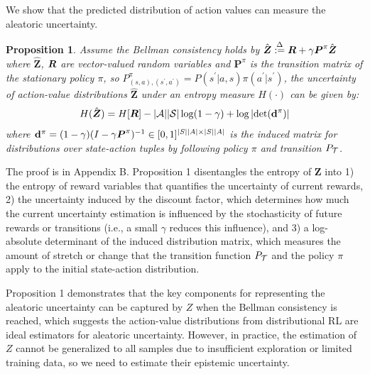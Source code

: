 \documentclass[letterpaper]{article} %
\newcommand{\state}{s}
\newcommand{\action}{a}
\newcommand{\transition}{t}
\newcommand{\reward}{r}
\newtheorem{proposition}{Proposition}
\begin{document}
We show that the predicted distribution of action values can measure the aleatoric uncertainty.

\begin{proposition}
Assume the Bellman consistency holds by $\hat{\boldsymbol{Z}} \overset{\Delta}{:=} \MakeUppercase{\boldsymbol{\reward}} + \gamma \boldsymbol{P}^{\pi}\hat{\boldsymbol{Z}}$ 
where $\hat{\boldsymbol{Z}}$, $\boldsymbol{\MakeUppercase{\reward}}$ are vector-valued random variables and $\boldsymbol{P}^{\pi}$ is the transition matrix of the stationary policy $\pi$, so $P^{\pi}_{(\state,\action),(\state^{\prime},\action^{\prime})}=P(\state^{\prime}|\action,\state)\pi(\action^{\prime}|\state^{\prime})$, the uncertainty of action-value distributions $\hat{\boldsymbol{Z}}$ under an entropy measure $H(\cdot)$ can be given by:
\begin{align}
    H(\hat{\boldsymbol{Z}}) = H[\boldsymbol{\MakeUppercase{\reward}}]-|\mathcal{\MakeUppercase{\action}}||\mathcal{\MakeUppercase{\state}}|\log(1-\gamma)+\log|\text{det}(\mathbf{d}^{\pi})|
\end{align}
where $\mathbf{d}^{\pi}=(1-\gamma)(I-\gamma \boldsymbol{P}^{\pi})^{-1}\in[0,1]^{|\MakeUppercase{\state}||\MakeUppercase{\action}|\times|\MakeUppercase{\state}||\MakeUppercase{\action}|}$ is the induced matrix for distributions over state-action tuples by following policy $\pi$ and transition $P_{\mathcal{\MakeUppercase{t}}}$. 
\end{proposition}

The proof is in Appendix B. Proposition 1 disentangles the entropy of $\boldsymbol{Z}$ into 1) the entropy of reward variables that quantifies the uncertainty of current rewards, 2) the uncertainty induced by the discount factor, which determines how much the current uncertainty estimation is influenced by the stochasticity of future rewards or transitions (i.e., a small $\gamma$ reduces this influence), and 3) a log-absolute determinant of the induced distribution matrix, which measures the amount of stretch or change that the transition function $P_{\mathcal{\MakeUppercase{\transition}}}$ and the policy $\pi$ apply to the initial state-action distribution.

Proposition 1 demonstrates that the key components for representing the aleatoric uncertainty can be captured by $Z$ when the Bellman consistency is reached, which suggests the action-value distributions from distributional RL are ideal estimators for aleatoric uncertainty.  However, in practice,  the estimation of $Z$ cannot be generalized to all samples due to insufficient exploration or limited training data, so we need to estimate their epistemic uncertainty. 
\end{document}
